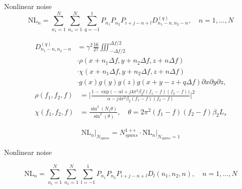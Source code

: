 \documentclass[10pt]{beamer}
\begin{document}
\begin{frame}{Nonlinear noise}
	\begin{equation*}
	\mathrm{NL}_n = \sum_{n_1 = 1}^{N}\sum_{n_1 = 1}^N\sum_{q=-1}^{1}P_{n_1}P_{n_2}P_{i+j-n+l}D^{(q)}_{n_1-n, n_2-n}, \quad n = 1, \ldots, N
	\end{equation*}
	
	\begin{align*} \label{eq:Dcoeff-original}\nonumber 
	D^{(q)}_{n_1-n, n_2-n} &= \gamma^2\frac{16}{27}\iiint_{-\Delta f/2}^{\Delta f/2} \\ \nonumber
	&\cdot\rho(x + n_1\Delta f, y + n_2\Delta f, z + n\Delta f) \\ \nonumber
	& \cdot\chi(x + n_1\Delta f, y + n_2\Delta f, z + n\Delta f) \\
	&\cdot g(x)g(y)g(z)g(x+y-z+q\Delta f)\partial x\partial y\partial z,
	\end{align*}
	\begin{align*}
	\rho(f_1, f_2, f) &= \Bigg|\frac{1 - \exp\Big(-\alpha l + j4\pi^2\beta_2l(f_1-f)(f_2-f)\Big)}{\alpha - j4\pi^2\beta_2(f_1-f)(f_2-f)}\Bigg|^2 \\
	\chi(f_1, f_2, f) &= \frac{\sin^2(N_s\theta)}{\sin^2(\theta)}, \quad \theta = 2\pi^2(f_1-f)(f_2-f)\beta_2L_s
	\end{align*}
	
	\begin{equation*}
		\mathrm{NL}_n\Big|_{N_{spans}} = N_{spans}^{1+\epsilon}\cdot\mathrm{NL}_n\Big|_{N_{spans} = 1}
	\end{equation*}
	
\end{frame}

\begin{frame}{Nonlinear noise}

\begin{center}
	\def\NONLINEAR{1}
	\resizebox{\textwidth}{!}{}
\end{center}
\begin{equation*}
\mathrm{NL}_n = \sum_{n_1 = 1}^{N}\sum_{n_1 = 1}^N\sum_{l=-1}^{1}P_{n_1}P_{n_2}P_{i+j-n+l}D_l(n_1, n_2, n), \quad n = 1, \ldots, N
\end{equation*}

\end{frame}
\end{document}
